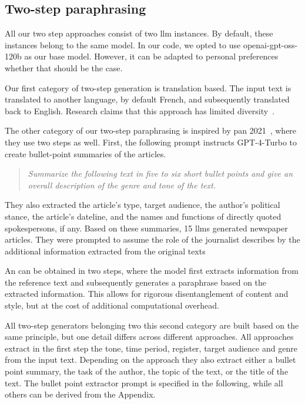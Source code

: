 \subsection{Two-step paraphrasing}

All our two step approaches consist of two \ac{llm} instances.
By default, these instances belong to the same model.
In our code, we opted to use openai-gpt-oss-120b as our base model.
However, it can be adapted to personal preferences whether that should be the case.

Our first category of two-step \imp{} generation is translation based.
The input text is translated to another language, by default French, and subsequently translated back to English.
Research claims that this approach has limited diversity~\citep{zhou_paraphrase_2025}.

The other category of our two-step paraphrasing is inspired by \ac{pan} 2021~\citep{bevendorff_overview_2024,ayele_overview_2024}, where they use two steps as well.
First, the following prompt instructs GPT-4-Turbo to create bullet-point summaries of the articles.
\begin{quote}
    \textit{Summarize the following text in five to six short bullet points and give an overall description
    of the genre and tone of the text.}
\end{quote}
They also extracted the article's type, target audience, the author's political stance, the article's dateline, and the names and functions of directly quoted spokespersons, if any.
Based on these summaries, 15 \acp{llm} generated newspaper articles.
They were prompted to assume the role of the journalist describes by the additional information extracted from the original texts \citep{bevendorff_overview_2024,ayele_overview_2024}

An \imp{} can be obtained in two steps, where the model first extracts information from the reference text and subsequently generates a paraphrase based on the extracted information. 
This allows for rigorous disentanglement of content and style, but at the cost of additional computational overhead. 

All two-step generators belonging two this second category are built based on the same principle, but one detail differs across different approaches.
All approaches extract in the first step the tone, time period, register, target audience and genre from the input text.
Depending on the approach they also extract either a bullet point summary, the task of the author, the topic of the text, or the title of the text. 
The bullet point extractor prompt is specified in the following, while all others can be derived from the Appendix.

